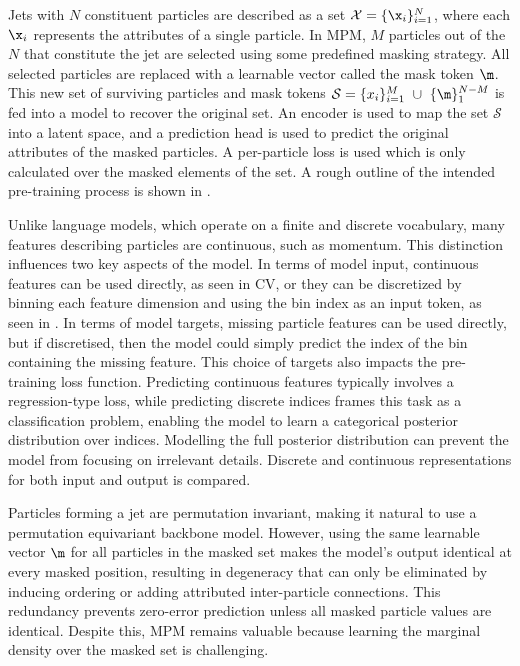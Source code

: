 Jets with $N$ constituent particles are described as a set $\mathcal{X}=\{\x_i\}_{i=1}^N$, where each $\x_i$ represents the attributes of a single particle.
In MPM, $M$ particles out of the $N$ that constitute the jet are selected using some predefined masking strategy.
All selected particles are replaced with a learnable vector called the mask token $\m$.
This new set of surviving particles and mask tokens $\mathcal{S}=\{x_i\}_{i=1}^M~\cup~\{\m\}_{1}^{N-M}$ is fed into a model to recover the original set.
An encoder is used to map the set $\mathcal{S}$ into a latent space, and a prediction head is used to predict the original attributes of the masked particles.
A per-particle loss is used which is only calculated over the masked elements of the set.
A rough outline of the intended pre-training process is shown in .

Unlike language models, which operate on a finite and discrete vocabulary, many features describing particles are continuous, such as momentum.
This distinction influences two key aspects of the model.
In terms of model input, continuous features can be used directly, as seen in CV, or they can be discretized by binning each feature dimension and using the bin index as an input token, as seen in \textcite{JetGPT}.
In terms of model targets, missing particle features can be used directly, but if discretised, then the model could simply predict the index of the bin containing the missing feature.
This choice of targets also impacts the pre-training loss function.
Predicting continuous features typically involves a regression-type loss, while predicting discrete indices frames this task as a classification problem, enabling the model to learn a categorical posterior distribution over indices.
Modelling the full posterior distribution can prevent the model from focusing on irrelevant details.
Discrete and continuous representations for both input and output is compared.

Particles forming a jet are permutation invariant, making it natural to use a permutation equivariant backbone model.
However, using the same learnable vector $\m$ for all particles in the masked set makes the model's output identical at every masked position, resulting in degeneracy that can only be eliminated by inducing ordering or adding attributed inter-particle connections.
This redundancy prevents zero-error prediction unless all masked particle values are identical.
Despite this, MPM remains valuable because learning the marginal density over the masked set is challenging.

